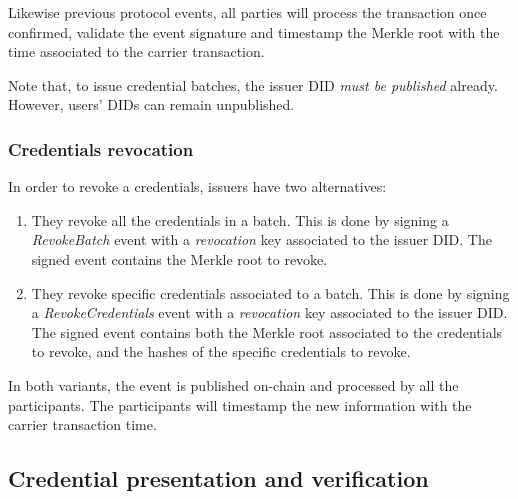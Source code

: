 \documentclass[10pt,a4paper]{article}
\begin{document}
Likewise previous protocol events, all parties will process the transaction once confirmed, validate the event signature and timestamp the Merkle root with the time associated to the carrier transaction.

Note that, to issue credential batches, the issuer DID \emph{must be published} already. However, users' DIDs can remain unpublished.

\subsubsection{Credentials revocation}

In order to revoke a credentials, issuers have two alternatives:
\begin{enumerate}
\item They revoke all the credentials in a batch.
      This is done by signing a \emph{RevokeBatch} event with a \emph{revocation} key associated to the issuer DID.
      The signed event contains the Merkle root to revoke.
\item They revoke specific credentials associated to a batch.
      This is done by signing a \emph{RevokeCredentials} event with a \emph{revocation} key associated to the issuer DID. 
      The signed event contains both the Merkle root associated to the credentials to revoke, and the hashes of the specific credentials to revoke.
\end{enumerate}

In both variants, the event is published on-chain and processed by all the participants. The participants will timestamp the new information with the carrier transaction time.

\subsection{Credential presentation and verification}
\end{document}
